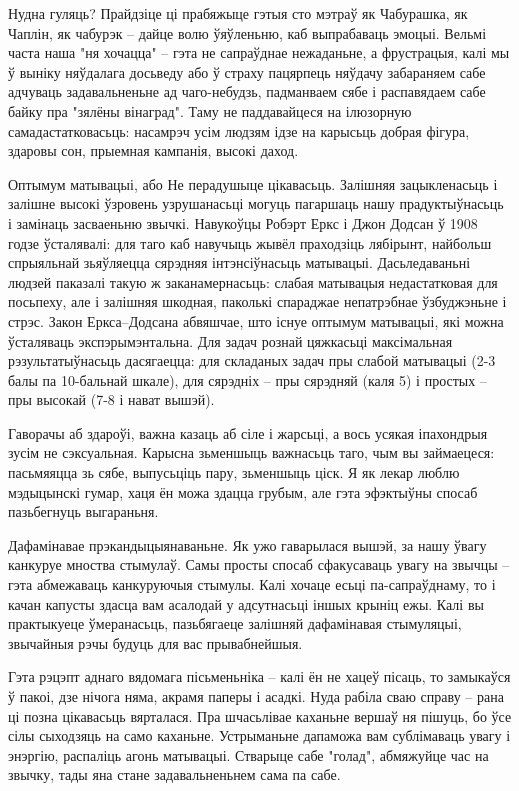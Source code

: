 Нудна гуляць? Прайдзіце ці прабяжыце гэтыя сто мэтраў як Чабурашка, як Чаплін, як чабурэк – дайце волю ўяўленьню, каб выпрабаваць эмоцыі. Вельмі часта наша "ня хочацца" – гэта не сапраўднае нежаданьне, а фрустрацыя, калі мы ў выніку няўдалага досьведу або ў страху пацярпець няўдачу забараняем сабе адчуваць задавальненьне ад чаго-небудзь, падманваем сябе і распавядаем сабе байку пра "зялёны вінаград". Таму не паддавайцеся на ілюзорную самадастатковасьць: насамрэч усім людзям ідзе на карысьць добрая фігура, здаровы сон, прыемная кампанія, высокі даход.

Оптымум матывацыі, або Не перадушыце цікавасьць. Залішняя зацыкленасьць і залішне высокі ўзровень узрушанасьці могуць пагаршаць нашу прадуктыўнасьць і замінаць засваеньню звычкі. Навукоўцы Робэрт Еркс і Джон Додсан ў 1908 годзе ўсталявалі: для таго каб навучыць жывёл праходзіць лябірынт, найбольш спрыяльнай зьяўляецца сярэдняя інтэнсіўнасьць матывацыі. Дасьледаваньні людзей паказалі такую ж заканамернасьць: слабая матывацыя недастатковая для посьпеху, але і залішняя шкодная, паколькі спараджае непатрэбнае ўзбуджэньне і стрэс. Закон Еркса--Додсана абвяшчае, што існуе оптымум матывацыі, які можна ўсталяваць экспэрымэнтальна. Для задач рознай цяжкасьці максімальная рэзультатыўнасьць дасягаецца: для складаных задач пры слабой матывацыі (2-3 балы па 10-бальнай шкале), для сярэдніх – пры сярэдняй (каля 5) і простых – пры высокай (7-8 і нават вышэй).

Гаворачы аб здароўі, важна казаць аб сіле і жарсьці, а вось усякая іпахондрыя зусім не сэксуальная. Карысна зьменшыць важнасьць таго, чым вы займаецеся: пасьмяяцца зь сябе, выпусьціць пару, зьменшыць ціск. Я як лекар люблю мэдыцынскі гумар, хаця ён можа здацца грубым, але гэта эфэктыўны спосаб пазьбегнуць выгараньня.

Дафамінавае прэкандыцыянаваньне. Як ужо гаварылася вышэй, за нашу ўвагу канкуруе мноства стымулаў. Самы просты спосаб сфакусаваць увагу на звычцы – гэта абмежаваць канкуруючыя стымулы. Калі хочаце есьці па-сапраўднаму, то і качан капусты здасца вам асалодай у адсутнасьці іншых крыніц ежы. Калі вы практыкуеце ўмеранасьць, пазьбягаеце залішняй дафамінавая стымуляцыі, звычайныя рэчы будуць для вас прывабнейшыя.

Гэта рэцэпт аднаго вядомага пісьменьніка – калі ён не хацеў пісаць, то замыкаўся ў пакоі, дзе нічога няма, акрамя паперы і асадкі. Нуда рабіла сваю справу – рана ці позна цікавасьць вярталася. Пра шчасьлівае каханьне вершаў ня пішуць, бо ўсе сілы сыходзяць на само каханьне. Устрыманьне дапаможа вам сублімаваць увагу і энэргію, распаліць агонь матывацыі. Стварыце сабе "голад", абмяжуйце час на звычку, тады яна стане задавальненьнем сама па сабе.

